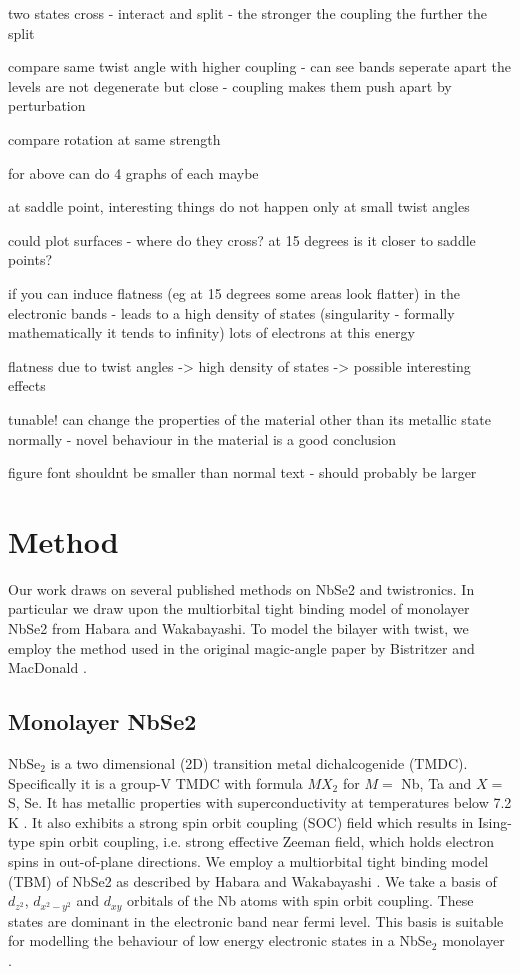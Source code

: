 \documentclass[12pt]{report} %
\begin{document}
  two states cross - interact and split - the stronger the coupling the further the split

 compare same twist angle with higher coupling - can see  bands seperate apart the levels are not degenerate but close - coupling makes them push apart by perturbation

 compare rotation at same strength 

 for above can do 4 graphs of each maybe

 at saddle point, interesting things do not happen only at small twist angles

  could plot surfaces - where do they cross? at 15 degrees is it closer to saddle points?

if you can induce flatness (eg at 15 degrees some areas look flatter) in the electronic bands - leads to a high density of states (singularity - formally mathematically it tends to infinity) lots of electrons at this energy

flatness due to twist angles -> high density of states -> possible interesting effects

tunable! can change the properties of the material other than its metallic state normally - novel behaviour in the material is a good conclusion


figure font shouldnt be smaller than normal text - should probably be larger


\section*{Method}
  Our work draws on several published methods on NbSe2 and twistronics. In particular we draw upon the multiorbital tight binding model of monolayer NbSe2 from Habara and Wakabayashi\cite{Habara2021}. To model the bilayer with twist, we employ the method used in the original magic-angle paper by Bistritzer and MacDonald \cite{Bistritzer2011}. 

\subsection*{Monolayer NbSe2}
  NbSe$_2$ is a two dimensional (2D) transition metal dichalcogenide (TMDC). Specifically it is a group-V TMDC with formula $MX_2$ for $M =$ Nb, Ta and $X =$ S, Se. It has metallic properties with superconductivity at temperatures below 7.2 K \cite{}. It also exhibits a strong spin orbit coupling (SOC) field which results in Ising-type spin orbit coupling, i.e. strong effective Zeeman field, which holds electron spins in out-of-plane directions. We employ a multiorbital tight binding model (TBM) of NbSe2 as described by Habara and Wakabayashi \cite{Habara2021}. We take a basis of $d_{z^2}$, $d_{x^2 - y^2}$ and $d_{xy}$ orbitals of the Nb atoms with spin orbit coupling. These states are dominant in the electronic band near fermi level. This basis is suitable for modelling the behaviour of low energy electronic states in a NbSe$_2$ monolayer \cite{}.
\end{document}
